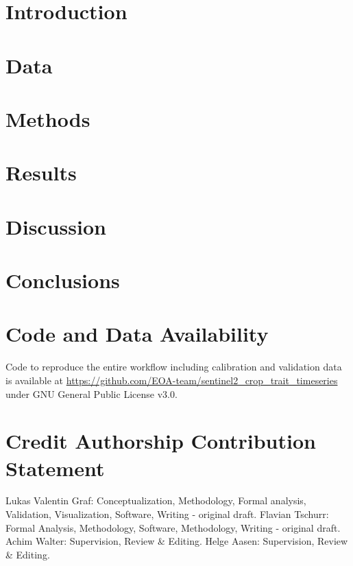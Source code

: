\section{Introduction}
\label{sec:introduction}


\section{Data}
\label{sec:drc_study-area-data}


\section{Methods}
\label{sec:drc_methods}


\section{Results}
\label{sec:drc_results}


\section{Discussion}
\label{sec:drc_discussion}



\section{Conclusions}
\label{sec:drc_conclusions}


\section*{Code and Data Availability}
\label{sec:code-data-availability}
Code to reproduce the entire workflow including calibration and validation data is available at \url{https://github.com/EOA-team/sentinel2_crop_trait_timeseries} under GNU General Public License v3.0.

\section*{Credit Authorship Contribution Statement}
Lukas Valentin Graf: Conceptualization, Methodology, Formal analysis, Validation, Visualization, Software, Writing - original draft. Flavian Tschurr: Formal Analysis, Methodology, Software, Methodology, Writing - original draft. Achim Walter: Supervision, Review \& Editing. Helge Aasen:  Supervision, Review \& Editing.


